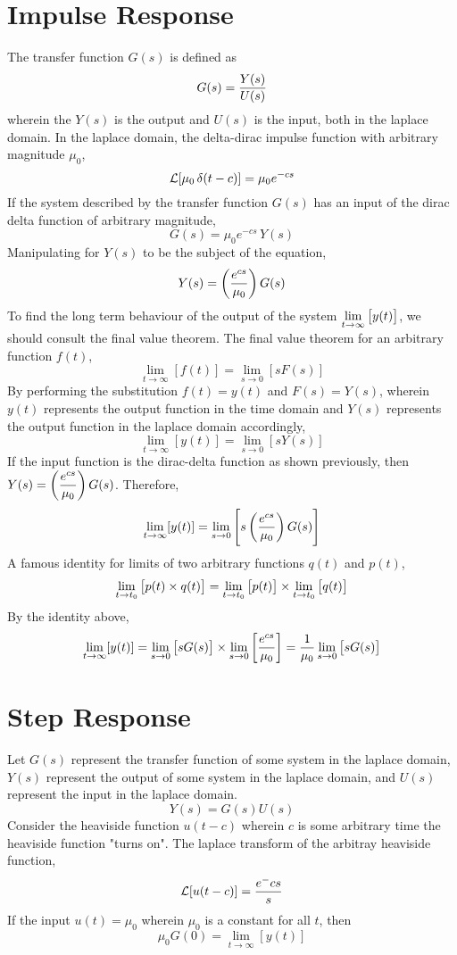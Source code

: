 \documentclass[a4paper, 12pt]{report}
\begin{document}
\begin{center}
\section{Impulse Response}
\begin{comment}
\end{comment}
The transfer function $G(s)$ is defined as 
$$G(s) = \frac{Y(s)}{U(s)}$$
wherein the $Y(s)$ is the output and $U(s)$ is the input, both in the laplace domain. In the laplace domain, the delta-dirac impulse function with arbitrary magnitude $\mu_0$,
$$\mathcal{L}[\mu_0\,\delta(t-c)] = \mu_0e^{-cs}$$
If the system described by the transfer function $G(s)$ has an input of the dirac delta function of arbitrary magnitude,
$$G(s) = \mu_0e^{-cs}\,Y(s)$$
Manipulating for $Y(s)$ to be the subject of the equation,
$$Y(s) = \left(\frac{e^{cs}}{\mu_0}\right)G(s)$$
To find the long term behaviour of the output of the system $\displaystyle{\lim_{t\to\infty}\left[y(t)\right]}$, we should consult the final value theorem. The final value theorem for an arbitrary function $f(t)$,
$$\lim_{t\to\infty}[f(t)] = \lim_{s\to0}[sF(s)]$$
By performing the substitution $f(t) = y(t)$ and $F(s) = Y(s)$, wherein $y(t)$ represents the output function in the time domain and $Y(s)$ represents the output function in the laplace domain accordingly,
$$\lim_{t\to\infty}[y(t)] = \lim_{s\to0}[sY(s)]$$
If the input function is the dirac-delta function as shown previously, then $\displaystyle{Y(s) = \left(\frac{e^{cs}}{\mu_0}\right)G(s)}$. Therefore,
$$\lim_{t\to\infty}[y(t)] = \lim_{s\to0}\left[s\left(\frac{e^{cs}}{\mu_0}\right)G(s)\right]$$
A famous identity for limits of two arbitrary functions $q(t)$ and $p(t)$,
$$\lim_{t\to t_0}\left[p(t)\times q(t)\right] = \lim_{t\to t_0}\left[p(t)\right]\times \lim_{t\to t_0}\left[q(t)\right]$$
By the identity above,
$$\lim_{t\to\infty}[y(t)] = \lim_{s\to0}\left[sG(s)\right] \times \lim_{s\to0}\left[\frac{e^{cs}}{\mu_0}\right] = \frac{1}{\mu_0}\lim_{s\to0}\left[sG(s)\right]$$
\section{Step Response}
\begin{comment}
\end{comment}
Let $G(s)$ represent the transfer function of some system in the laplace domain, $Y(s)$ represent the output of some system in the laplace domain, and $U(s)$ represent the input in the laplace domain.
$$Y(s) = G(s)U(s)$$
Consider the heaviside function $u(t-c)$ wherein $c$ is some arbitrary time the heaviside function "turns on". The laplace transform of the arbitray heaviside function,
$$\mathcal{L}[u(t-c)] = \frac{e^-cs}{s}$$
If the input $u(t) = \mu_0$ wherein $\mu_0$ is a constant for all $t$, then
$$\mu_0G(0) = \lim_{t\to\infty}[y(t)]$$

\end{center}
\end{document}
